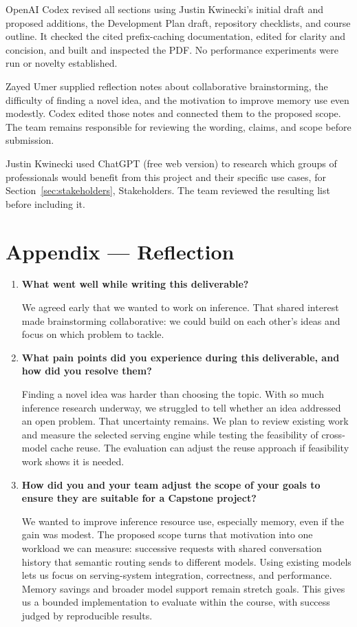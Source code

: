 \documentclass[11pt]{article}
\begin{document}
OpenAI Codex revised all sections using Justin Kwinecki's initial draft
and proposed additions, the Development Plan draft, repository checklists,
and course outline. It checked the cited prefix-caching documentation,
edited for clarity and concision, and built and inspected the PDF. No
performance experiments were run or novelty established.

Zayed Umer supplied reflection notes about collaborative brainstorming,
the difficulty of finding a novel idea, and the motivation to improve
memory use even modestly. Codex edited those notes and connected them to
the proposed scope. The team remains responsible for reviewing the wording,
claims, and scope before submission.

Justin Kwinecki used ChatGPT (free web version) to research which groups
of professionals would benefit from this project and their specific use
cases, for Section~\ref{sec:stakeholders}, Stakeholders. The team reviewed
the resulting list before including it.

\section*{Appendix --- Reflection}

\begin{enumerate}
  \item \textbf{What went well while writing this deliverable?}

  We agreed early that we wanted to work on inference. That shared
  interest made brainstorming collaborative: we could build on each
  other's ideas and focus on which problem to tackle.

  \item \textbf{What pain points did you experience during this
  deliverable, and how did you resolve them?}

  Finding a novel idea was harder than choosing the topic. With so much
  inference research underway, we struggled to tell whether an idea
  addressed an open problem. That uncertainty remains. We plan to review
  existing work and measure the selected serving engine while testing the
  feasibility of cross-model cache reuse. The evaluation can adjust the
  reuse approach if feasibility work shows it is needed.

  \item \textbf{How did you and your team adjust the scope of your goals
  to ensure they are suitable for a Capstone project?}

  We wanted to improve inference resource use, especially memory, even
  if the gain was modest. The proposed scope turns that motivation into
  one workload we can measure: successive requests with shared conversation
  history that semantic routing sends to different models. Using existing
  models lets us focus on serving-system integration, correctness, and
  performance. Memory savings and broader model support remain stretch
  goals. This gives us a bounded implementation to evaluate within the
  course, with success judged by reproducible results.
\end{enumerate}
\end{document}
